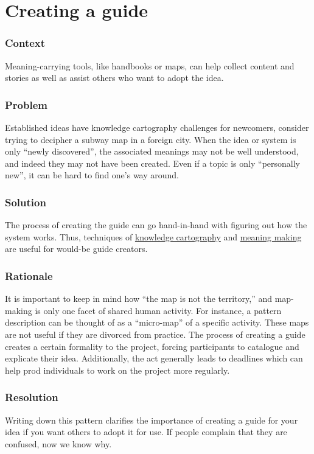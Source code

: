 \section{Creating a guide}\label{sec:Creating a guide}
\subsubsection*{Context} Meaning-carrying tools, like handbooks or maps, can help collect content and stories as well as assist others who want to adopt the idea.

\subsubsection*{Problem} 
Established ideas have knowledge cartography challenges for newcomers, consider trying to decipher a subway map in a foreign city. When the idea or system is only ``newly discovered'', the associated meanings may not be well understood, and indeed they may not have been created. Even if a topic is only ``personally new'', it can be hard to find one's way around.

\subsubsection*{Solution}
The process of creating the guide can go hand-in-hand with figuring out how the system works.  Thus, techniques of \href{http://knowledgecartography.org/}{knowledge cartography} and \href{http://www.hitl.washington.edu/publications/r-97-47/two.html}{meaning making} are useful for would-be guide creators.

\subsubsection*{Rationale} 
It is important to keep in mind how ``the map is not the territory,'' and map-making is only one facet of shared human activity. For instance, a pattern description can be thought of as a ``micro-map'' of a specific activity. These maps are not useful if they are divorced from practice. The process of creating a guide creates a certain formality to the project, forcing participants to catalogue and explicate their idea. Additionally, the act generally leads to deadlines which can help prod individuals to work on the project more regularly.

\subsubsection*{Resolution}
Writing down this pattern clarifies the importance of creating a guide for your idea if you want others to adopt it for use.  If people complain that they are confused, now we know why.

